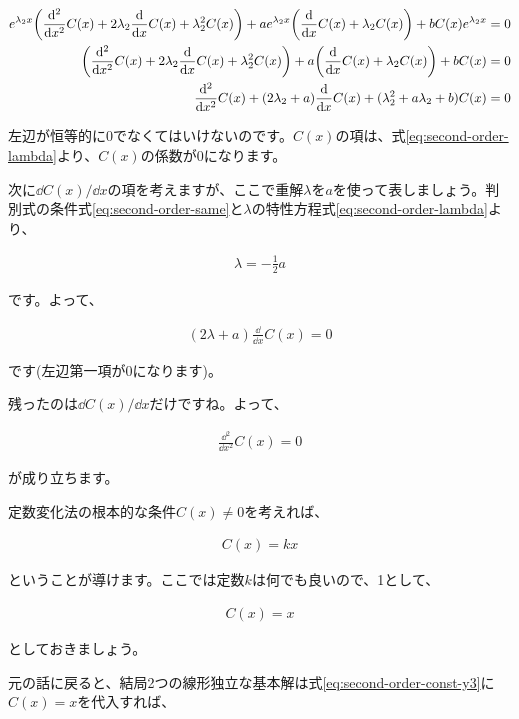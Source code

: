 \begin{eqnarray}
    e^{\lambda_2 x}\pqty{\frac{\dd^2}{\dd x^2}C(x)+2\lambda_2 \frac{\dd}{\dd x}C(x)+\lambda_2^2C(x)}+ae^{\lambda_2 x}\pqty{\frac{\dd}{\dd x}C(x)+\lambda_2 C(x)}+bC(x)e^{\lambda_2 x}=0 \\
    \pqty{\frac{\dd^2}{\dd x^2}C(x)+2\lambda_2 \frac{\dd}{\dd x}C(x)+\lambda_2^2C(x)}+a\pqty{\frac{\dd}{\dd x}C(x)+\lambda_2 C(x)}+bC(x)=0 \nonumber \\
    \frac{\dd^2}{\dd x^2}C(x)+(2\lambda_2+a)\frac{\dd}{\dd x}C(x)+(\lambda_2^2+a\lambda_2+b)C(x)=0
\end{eqnarray}

左辺が恒等的に0でなくてはいけないのです。$C(x)$の項は、式\ref{eq:second-order-lambda}より、$C(x)$の係数が0になります。

次に$\dd C(x)/\dd x$の項を考えますが、ここで重解$\lambda$を$a$を使って表しましょう。判別式の条件式\ref{eq:second-order-same}と$\lambda$の特性方程式\ref{eq:second-order-lambda}より、

\begin{eqnarray}
    \lambda=-\frac{1}{2}a
    \label{eq:second-order-lambda-same}
\end{eqnarray}

\noindent
です。よって、

\begin{eqnarray}
    (2\lambda+a)\frac{\dd}{\dd x}C(x)=0
\end{eqnarray}

\noindent
です(左辺第一項が0になります)。

残ったのは$\dd C(x)/\dd x$だけですね。よって、

\begin{eqnarray}
    \frac{\dd^2}{\dd x^2}C(x)=0
\end{eqnarray}

\noindent
が成り立ちます。

定数変化法の根本的な条件$C(x)\neq0$を考えれば、

\begin{eqnarray}
    C(x)=kx
\end{eqnarray}

ということが導けます。ここでは定数$k$は何でも良いので、1として、

\begin{eqnarray}
    C(x)=x
\end{eqnarray}

\noindent
としておきましょう。

元の話に戻ると、結局2つの線形独立な基本解は式\ref{eq:second-order-const-y3}に$C(x)=x$を代入すれば、


